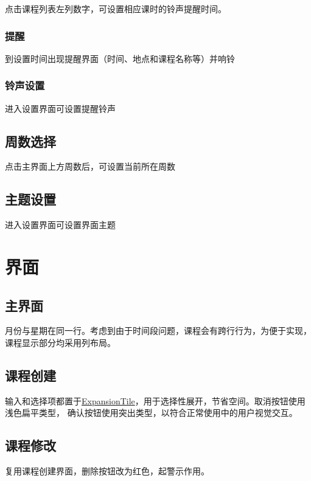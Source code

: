 \documentclass[12pt]{article}
\begin{document}
      点击课程列表左列数字，可设置相应课时的铃声提醒时间。

    \subsubsection{提醒}

      到设置时间出现提醒界面（时间、地点和课程名称等）并响铃

    \subsubsection{铃声设置}

      进入设置界面可设置提醒铃声

  \subsection{周数选择}

    点击主界面上方周数后，可设置当前所在周数

  \subsection{主题设置}

    进入设置界面可设置界面主题

\section{界面}

  \subsection{主界面}

    月份与星期在同一行。考虑到由于时间段问题，课程会有跨行行为，为便于实现，课程显示部分均采用列布局。

  \subsection{课程创建}

    输入和选择项都置于\uline{ExpansionTile}，用于选择性展开，节省空间。取消按钮使用浅色扁平类型，
    确认按钮使用突出类型，以符合正常使用中的用户视觉交互。

  \subsection{课程修改}

    复用课程创建界面，删除按钮改为红色，起警示作用。
\end{document}
